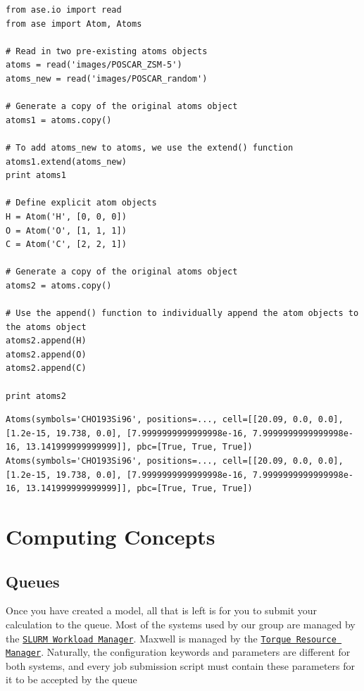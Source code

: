 \documentclass[11pt]{article}
\begin{document}
\begin{verbatim}
from ase.io import read
from ase import Atom, Atoms

# Read in two pre-existing atoms objects
atoms = read('images/POSCAR_ZSM-5')
atoms_new = read('images/POSCAR_random')

# Generate a copy of the original atoms object
atoms1 = atoms.copy()

# To add atoms_new to atoms, we use the extend() function
atoms1.extend(atoms_new)
print atoms1

# Define explicit atom objects
H = Atom('H', [0, 0, 0])
O = Atom('O', [1, 1, 1]) 
C = Atom('C', [2, 2, 1])

# Generate a copy of the original atoms object
atoms2 = atoms.copy()

# Use the append() function to individually append the atom objects to the atoms object
atoms2.append(H)
atoms2.append(O)
atoms2.append(C)

print atoms2
\end{verbatim}

\begin{verbatim}
Atoms(symbols='CHO193Si96', positions=..., cell=[[20.09, 0.0, 0.0], [1.2e-15, 19.738, 0.0], [7.9999999999999998e-16, 7.9999999999999998e-16, 13.141999999999999]], pbc=[True, True, True])
Atoms(symbols='CHO193Si96', positions=..., cell=[[20.09, 0.0, 0.0], [1.2e-15, 19.738, 0.0], [7.9999999999999998e-16, 7.9999999999999998e-16, 13.141999999999999]], pbc=[True, True, True])
\end{verbatim}

\section{Computing Concepts}
\label{sec:orgad4fa6b}
\subsection{Queues}
\label{sec:org879f5d1}
Once you have created a model, all that is left is for you to submit your calculation to the queue. Most of the systems used by our group are managed by the \href{http://slurm.schedmd.com/}{\texttt{SLURM Workload Manager}}. Maxwell is managed by the \href{http://www.adaptivecomputing.com/products/open-source/torque/}{\texttt{Torque Resource Manager}}. Naturally, the configuration keywords and parameters are different for both systems, and every job submission script must contain these parameters for it to be accepted by the queue
\end{document}
